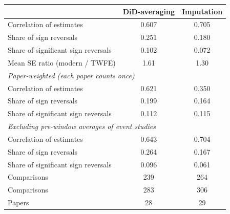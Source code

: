 \begin{tabular}{lcc}
\toprule
 & DiD-averaging & Imputation \\
\midrule
Correlation of estimates & 0.607 & 0.705 \\
Share of sign reversals & 0.251 & 0.180 \\
Share of significant sign reversals & 0.102 & 0.072 \\
Mean SE ratio (modern / TWFE) & 1.61 & 1.30 \\
\midrule
\multicolumn{3}{l}{\emph{Paper-weighted (each paper counts once)}} \\
Correlation of estimates & 0.621 & 0.350 \\
Share of sign reversals & 0.199 & 0.164 \\
Share of significant sign reversals & 0.112 & 0.115 \\
\midrule
\multicolumn{3}{l}{\emph{Excluding pre-window averages of event studies}} \\
Correlation of estimates & 0.643 & 0.704 \\
Share of sign reversals & 0.264 & 0.167 \\
Share of significant sign reversals & 0.096 & 0.061 \\
Comparisons & 239 & 264 \\
\midrule
Comparisons & 283 & 306 \\
Papers & 28 & 29 \\
\bottomrule
\end{tabular}
